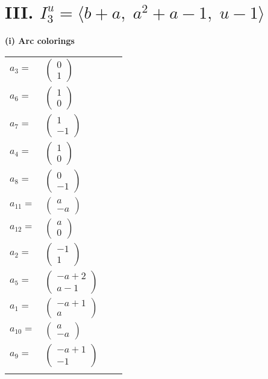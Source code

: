 \documentclass[1p]{elsarticle_modified}
\theoremstyle{definition}
\begin{document}
\centering \section*{III. $I^u_{3}= \langle b+a,\;a^2+a-1,\;u-1 \rangle$}
\flushleft \textbf{(i) Arc colorings}\\
\begin{tabular}{m{7pt} m{180pt} m{7pt} m{180pt} }
\flushright $a_{3}=$&$\begin{pmatrix}0\\1\end{pmatrix}$ \\
\flushright $a_{6}=$&$\begin{pmatrix}1\\0\end{pmatrix}$ \\
\flushright $a_{7}=$&$\begin{pmatrix}1\\-1\end{pmatrix}$ \\
\flushright $a_{4}=$&$\begin{pmatrix}1\\0\end{pmatrix}$ \\
\flushright $a_{8}=$&$\begin{pmatrix}0\\-1\end{pmatrix}$ \\
\flushright $a_{11}=$&$\begin{pmatrix}a\\- a\end{pmatrix}$ \\
\flushright $a_{12}=$&$\begin{pmatrix}a\\0\end{pmatrix}$ \\
\flushright $a_{2}=$&$\begin{pmatrix}-1\\1\end{pmatrix}$ \\
\flushright $a_{5}=$&$\begin{pmatrix}- a+2\\a-1\end{pmatrix}$ \\
\flushright $a_{1}=$&$\begin{pmatrix}- a+1\\a\end{pmatrix}$ \\
\flushright $a_{10}=$&$\begin{pmatrix}a\\- a\end{pmatrix}$ \\
\flushright $a_{9}=$&$\begin{pmatrix}- a+1\\-1\end{pmatrix}$\\&\end{tabular}
\end{document}
